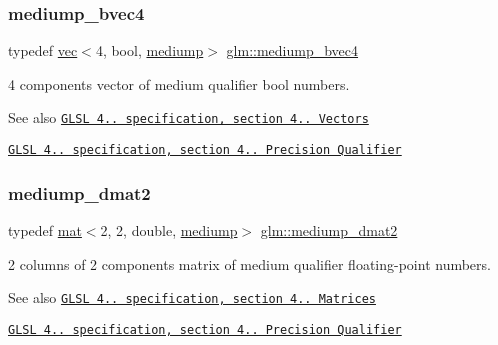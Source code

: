 \subsubsection{\texorpdfstring{mediump\+\_\+bvec4}{mediump\_bvec4}}
{\footnotesize\ttfamily typedef \hyperlink{structglm_1_1vec}{vec}$<$4, bool, \hyperlink{namespaceglm_a36ed105b07c7746804d7fdc7cc90ff25a6416f3ea0c9025fb21ed50c4d6620482}{mediump}$>$ \hyperlink{group__core__precision_ga064ca037c066a4d47ab6d34c2cf0ae2f}{glm\+::mediump\+\_\+bvec4}}

4 components vector of medium qualifier bool numbers.

\begin{DoxySeeAlso}{See also}
\href{http://www.opengl.org/registry/doc/GLSLangSpec.4.20.8.pdf}{\tt G\+L\+SL 4.. specification, section 4.. Vectors} 

\href{http://www.opengl.org/registry/doc/GLSLangSpec.4.20.8.pdf}{\tt G\+L\+SL 4.. specification, section 4.. Precision Qualifier} 
\end{DoxySeeAlso}
\mbox{\label{group__core__precision_gadbf2ed2cfb596bd2ca7e980777c0acde}} 
\subsubsection{\texorpdfstring{mediump\+\_\+dmat2}{mediump\_dmat2}}
{\footnotesize\ttfamily typedef \hyperlink{structglm_1_1mat}{mat}$<$2, 2, double, \hyperlink{namespaceglm_a36ed105b07c7746804d7fdc7cc90ff25a6416f3ea0c9025fb21ed50c4d6620482}{mediump}$>$ \hyperlink{group__core__precision_gadbf2ed2cfb596bd2ca7e980777c0acde}{glm\+::mediump\+\_\+dmat2}}

2 columns of 2 components matrix of medium qualifier floating-\/point numbers.

\begin{DoxySeeAlso}{See also}
\href{http://www.opengl.org/registry/doc/GLSLangSpec.4.20.8.pdf}{\tt G\+L\+SL 4.. specification, section 4.. Matrices} 

\href{http://www.opengl.org/registry/doc/GLSLangSpec.4.20.8.pdf}{\tt G\+L\+SL 4.. specification, section 4.. Precision Qualifier} 
\end{DoxySeeAlso}
\mbox{\label{group__core__precision_ga3d91f269872b4664d2f500b6dee986eb}} 
